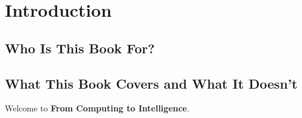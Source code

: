 \chapter*{Introduction}



\section*{Who Is This Book For?}

\section*{What This Book Covers and What It Doesn't}

Welcome to \textbf{From Computing to Intelligence}.

\vspace{1cm}

\afterpage{\blankpage}